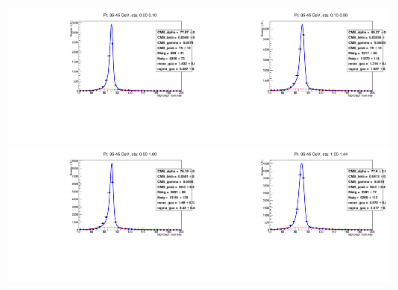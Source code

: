 \begin{figure}[htb]
  \begin{center}
   \includegraphics[width=0.45\textwidth]{../figs/figs_v11/ELECTRON_WGamma/EtoGammaFits/sa_hZmass_h_Data_EtoGamma_Enr_BARREL_pt35to45_ieta0_noWMtCut.pdf}\includegraphics[width=0.45\textwidth]{../figs/figs_v11/ELECTRON_WGamma/EtoGammaFits/sa_hZmass_h_Data_EtoGamma_Enr_BARREL_pt35to45_ieta1_noWMtCut.pdf}\\
   \includegraphics[width=0.45\textwidth]{../figs/figs_v11/ELECTRON_WGamma/EtoGammaFits/sa_hZmass_h_Data_EtoGamma_Enr_BARREL_pt35to45_ieta2_noWMtCut.pdf}\includegraphics[width=0.45\textwidth]{../figs/figs_v11/ELECTRON_WGamma/EtoGammaFits/sa_hZmass_h_Data_EtoGamma_Enr_BARREL_pt35to45_ieta3_noWMtCut.pdf}\\

\end{center}
\end{figure}
